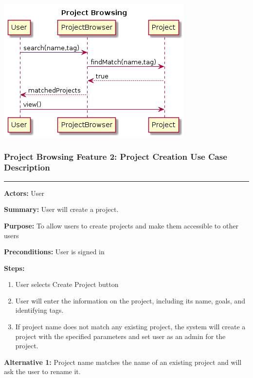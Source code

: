 \documentclass[twoside,letterpaper]{article}
\begin{document}
\bigskip

\includegraphics[width=\textwidth]{images/SequenceDiagrams/ProjectBrowsingProjectBrowsing}

\newpage
\subsubsection[Project Browsing Feature 2: Project Creation Use Case Description]{\rmfamily\bfseries\color{black}
Project Browsing Feature 2: Project Creation Use Case Description}
\hypertarget{RefHeading22059017292}{}

\vspace{2pt}
\hrule
\vspace{8pt}
\textbf{Actors:} User \newline

\noindent\textbf{Summary:} User will create a project. \newline

\noindent\textbf{Purpose:} To allow users to create projects and make them accessible to other users \newline

\noindent\textbf{Preconditions:} User is signed in \newline

\noindent\textbf{Steps:} \begin{enumerate}
	\item User selects Create Project button
	\item User will enter the information on the project, including its name, goals, and identifying tags.
	\item If project name does not match any existing project, the system will create a project with the specified parameters and set user as an admin for the project.
\end{enumerate}
\noindent\textbf{Alternative 1:} Project name matches the name of an existing project and will ask the user to rename it. \newline
\end{document}

